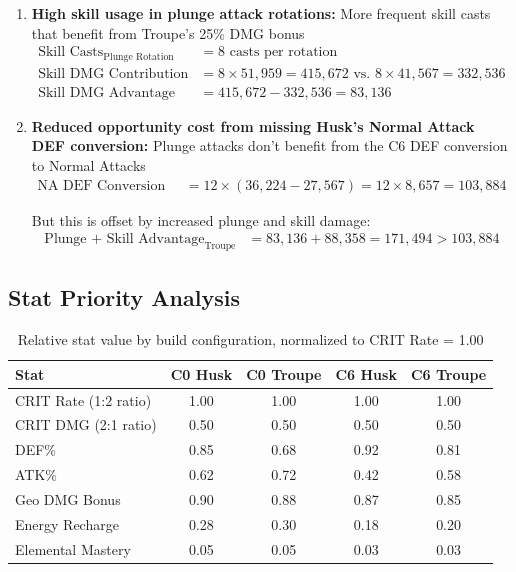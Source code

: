 \documentclass[12pt,a4paper]{article}
\begin{document}
\begin{enumerate}
    \item \textbf{High skill usage in plunge attack rotations:} More frequent skill casts that benefit from Troupe's 25\% DMG bonus
    \begin{align}
    \text{Skill Casts}_{\text{Plunge Rotation}} &= 8 \text{ casts per rotation} \\
    \text{Skill DMG Contribution} &= 8 \times 51,959 = 415,672 \text{ vs. } 8 \times 41,567 = 332,536 \\
    \text{Skill DMG Advantage} &= 415,672 - 332,536 = 83,136
    \end{align}
    
    \item \textbf{Reduced opportunity cost from missing Husk's Normal Attack DEF conversion:} Plunge attacks don't benefit from the C6 DEF conversion to Normal Attacks
    \begin{align}
    \text{NA DEF Conversion Loss} &= 12 \times (36,224 - 27,567) = 12 \times 8,657 = 103,884
    \end{align}
    
    But this is offset by increased plunge and skill damage:
    \begin{align}
    \text{Plunge + Skill Advantage}_{\text{Troupe}} &= 83,136 + 88,358 = 171,494 > 103,884
    \end{align}
\end{enumerate}

\subsection{Stat Priority Analysis}

\begin{table}[h]
\centering
\begin{tabular}{lcccc}
\toprule
\textbf{Stat} & \textbf{C0 Husk} & \textbf{C0 Troupe} & \textbf{C6 Husk} & \textbf{C6 Troupe} \\
\midrule
CRIT Rate (1:2 ratio) & 1.00 & 1.00 & 1.00 & 1.00 \\
CRIT DMG (2:1 ratio) & 0.50 & 0.50 & 0.50 & 0.50 \\
DEF\% & 0.85 & 0.68 & 0.92 & 0.81 \\
ATK\% & 0.62 & 0.72 & 0.42 & 0.58 \\
Geo DMG Bonus & 0.90 & 0.88 & 0.87 & 0.85 \\
Energy Recharge & 0.28 & 0.30 & 0.18 & 0.20 \\
Elemental Mastery & 0.05 & 0.05 & 0.03 & 0.03 \\
\bottomrule
\end{tabular}
\caption{Relative stat value by build configuration, normalized to CRIT Rate = 1.00}
\label{tab:stat_priority}
\end{table}
\end{document}
